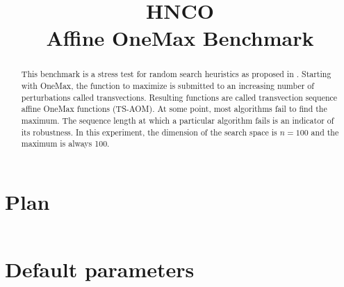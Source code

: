 \documentclass[a4paper]{article}
\begin{document}



\title{HNCO\\
  Affine OneMax Benchmark}
\maketitle

\begin{abstract}
  This benchmark is a stress test for random search heuristics as
  proposed in \cite{10.1145/3449726.3459497}. Starting with OneMax,
  the function to maximize is submitted to an increasing number of
  perturbations called transvections. Resulting functions are called
  transvection sequence affine OneMax functions (TS-AOM). At some
  point, most algorithms fail to find the maximum. The sequence length
  at which a particular algorithm fails is an indicator of its
  robustness. In this experiment, the dimension of the search space is
  $n = 100$ and the maximum is always 100.
\end{abstract}

\tableofcontents



 

\appendix

\section{Plan}

\inputminted[breaklines=true]{json}{../pretty.json}

\section{Default parameters}

\inputminted[breaklines=true]{text}{../log.defaults}
\end{document}
